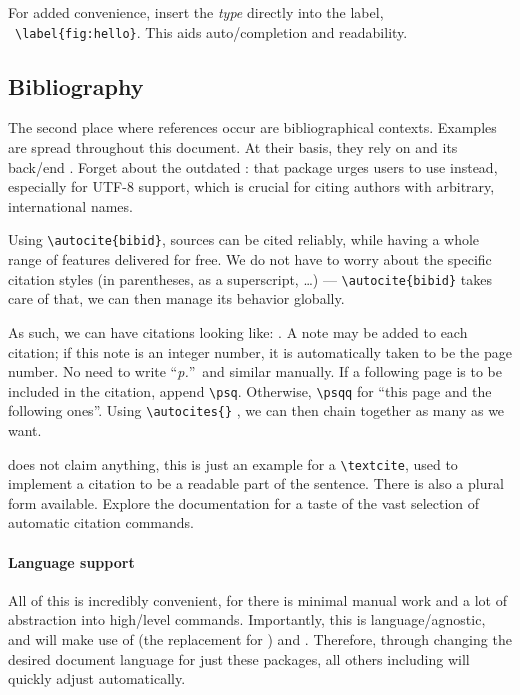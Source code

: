 For added convenience, insert the \emph{type} directly into the label,
\ \verb|\label{fig:hello}|.
This aids auto\-/completion and readability.

\subsection{Bibliography}
\label{ch:bibliography_rationale}

The second place where references occur are bibliographical contexts.
Examples are spread throughout this document.
At their basis, they rely on  and its back\-/end
.
Forget about the outdated : that package urges users to use
 instead, especially for UTF-8 support, which is crucial
for citing authors with arbitrary, international names.

Using \verb|\autocite{bibid}|, sources can be cited reliably, while having a whole range
of features delivered for free.
We do not have to worry about the specific citation styles
(in parentheses, as a superscript, \dots) ---
\verb|\autocite{bibid}| takes care of that, we can then manage its behavior globally.

As such, we can have citations looking like:
\cites[8]{einsteinZurElektrodynamikBewegter1905}[29\psqq]{goossensLaTeXCompanion1993}[2-9]{knuthTeXbook1986}%
[89\psq]{knuthFundamentalAlgorithms1973}{diracPrinciplesQuantumMechanics1981}
.
A note may be added to each citation; if this note is an integer number, it is
automatically taken to be the page number.
No need to write \enquote{\emph{p.}}\ and similar manually.
If a following page is to be included in the citation, append \verb|\psq|.
Otherwise, \verb|\psqq| for \enquote{this page and the following ones}.
Using \verb|\autocites{}| , we can then chain together as many as we want.

\textcite[3]{diracPrinciplesQuantumMechanics1981} does not claim anything, this is just an example
for a \verb|\textcite|, used to implement a citation to be a readable part of the
sentence.
There is also a plural form available.
Explore the documentation for a taste of the vast selection of automatic citation
commands.

\paragraph{Language support}
All of this is incredibly convenient, for there is minimal manual work and a lot
of abstraction into high\-/level commands.
Importantly, this is language\-/agnostic, and  will make use
of  (the  replacement for )
and .
Therefore, through changing the desired document language for just these packages,
all others including  will quickly adjust automatically.

